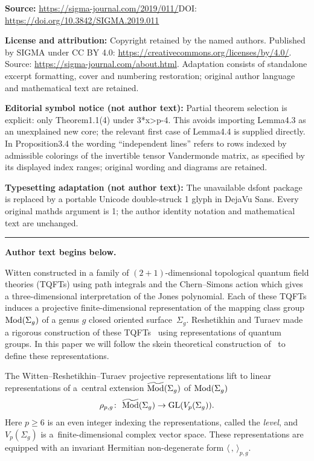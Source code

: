 \documentclass[11pt]{article}
\numberwithin{equation}{section}
\begin{document}
\noindent\textbf{Source:} \url{https://sigma-journal.com/2019/011/}\quad DOI: \url{https://doi.org/10.3842/SIGMA.2019.011}\par
\noindent\textbf{License and attribution:} Copyright retained by the named authors. Published by SIGMA under CC BY 4.0: \url{https://creativecommons.org/licenses/by/4.0/}. Source: \url{https://sigma-journal.com/about.html}. Adaptation consists of standalone excerpt formatting, cover and numbering restoration; original author language and mathematical text are retained.\par
\noindent\textbf{Editorial symbol notice (not author text):} Partial theorem selection is explicit: only Theorem1.1(4) under 3*x>p-4. This avoids importing Lemma4.3 as an unexplained new core; the relevant first case of Lemma4.4 is supplied directly. In Proposition3.4 the wording “independent lines” refers to rows indexed by admissible colorings of the invertible tensor Vandermonde matrix, as specified by its displayed index ranges; original wording and diagrams are retained.\par
\noindent\textbf{Typesetting adaptation (not author text):} The unavailable dsfont package is replaced by a portable Unicode double-struck 1 glyph in DejaVu Sans. Every original mathds argument is 1; the author identity notation and mathematical text are unchanged.\par
\medskip\hrule\medskip\noindent\textbf{Author text begins below.}\par
\setcounter{section}{1}
\setcounter{subsection}{0}
\setcounter{subsubsection}{0}
\setcounter{Theorem}{0}
\setcounter{equation}{0}
Witten constructed in \cite{Wi2} a family of $(2+1)$-dimensional topological quantum field theories (TQFTs) using path integrals and the Chern--Simons action which gives a three-dimensional interpretation of the Jones polynomial. Each of these TQFTs induces a projective finite-dimensional representation of the mapping class group $\operatorname{Mod}(\Sigma_g)$ of a genus $g$ closed oriented surface~$\Sigma_g$. Reshetikhin and Turaev made a rigorous construction of these TQFTs~\cite{RT} using representations of quantum groups. In this paper we will follow the skein theoretical construction of~\cite{BHMV2, Li2} to define these representations.

The Witten--Reshetikhin--Turaev projective representations lift to linear representations of a~central extension $\widetilde{\operatorname{Mod}}(\Sigma_g)$ of $\operatorname{Mod}(\Sigma_g)$
\begin{gather*} \rho_{p,g}\colon \ \widetilde{\operatorname{Mod}}(\Sigma_g) \rightarrow \operatorname{GL}(V_p(\Sigma_g)).\end{gather*}
Here $p\geq 6$ is an even integer indexing the representations, called the \textit{level}, and $V_p(\Sigma_g)$ is a~finite-dimensional complex vector space. These representations are equipped with an invariant Hermitian non-degenerate form $\langle \, ,\, \rangle_{p,g}$.
\end{document}
